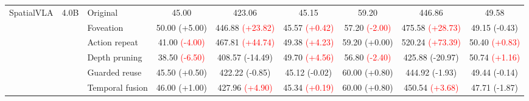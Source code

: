 \begin{table}[t]
\begin{tabular}{cclcccccc}
\multirow[c]{6}{*}{SpatialVLA}
& \multirow[c]{6}{*}{4.0B}
& Original & 45.00 & 423.06 & 45.15 & 59.20 & 446.86 & 49.58 \\
& & Foveation & 50.00 {\scriptsize\textcolor{green!50!black}{(+5.00)}} & 446.88 {\scriptsize\textcolor{red}{(+23.82)}} & 45.57 {\scriptsize\textcolor{red}{(+0.42)}} & 57.20 {\scriptsize\textcolor{red}{(-2.00)}} & 475.58 {\scriptsize\textcolor{red}{(+28.73)}} & 49.15 {\scriptsize\textcolor{green!50!black}{(-0.43)}} \\
& & Action repeat & 41.00 {\scriptsize\textcolor{red}{(-4.00)}} & 467.81 {\scriptsize\textcolor{red}{(+44.74)}} & 49.38 {\scriptsize\textcolor{red}{(+4.23)}} & 59.20 {\scriptsize\textcolor{green!50!black}{(+0.00)}} & 520.24 {\scriptsize\textcolor{red}{(+73.39)}} & 50.40 {\scriptsize\textcolor{red}{(+0.83)}} \\
& & Depth pruning & 38.50 {\scriptsize\textcolor{red}{(-6.50)}} & 408.57 {\scriptsize\textcolor{green!50!black}{(-14.49)}} & 49.70 {\scriptsize\textcolor{red}{(+4.56)}} & 56.80 {\scriptsize\textcolor{red}{(-2.40)}} & 425.88 {\scriptsize\textcolor{green!50!black}{(-20.97)}} & 50.74 {\scriptsize\textcolor{red}{(+1.16)}} \\
& & Guarded reuse & 45.50 {\scriptsize\textcolor{green!50!black}{(+0.50)}} & 422.22 {\scriptsize\textcolor{green!50!black}{(-0.85)}} & 45.12 {\scriptsize\textcolor{green!50!black}{(-0.02)}} & 60.00 {\scriptsize\textcolor{green!50!black}{(+0.80)}} & 444.92 {\scriptsize\textcolor{green!50!black}{(-1.93)}} & 49.44 {\scriptsize\textcolor{green!50!black}{(-0.14)}} \\
& & Temporal fusion & 46.00 {\scriptsize\textcolor{green!50!black}{(+1.00)}} & 427.96 {\scriptsize\textcolor{red}{(+4.90)}} & 45.34 {\scriptsize\textcolor{red}{(+0.19)}} & 60.00 {\scriptsize\textcolor{green!50!black}{(+0.80)}} & 450.54 {\scriptsize\textcolor{red}{(+3.68)}} & 47.71 {\scriptsize\textcolor{green!50!black}{(-1.87)}} \\
\cmidrule(lr){1-9}


\end{tabular}
\end{table}
